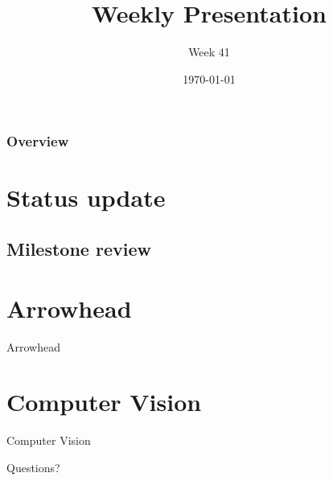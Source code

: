 \documentclass{beamer}
\title{Weekly Presentation}
\subtitle{Week 41}
\author{}
\institute{Luleå University of Technology}
\date{\today}
\begin{document}
\begin{frame}
    \titlepage
\end{frame}

\begin{frame}
    \frametitle{Overview}
    \tableofcontents
\end{frame}

\section{Status update}
%
\subsection{Milestone review}



\section{Arrowhead}
\begin{frame}
    \centering
    \Huge Arrowhead
\end{frame}

\section{Computer Vision}
\begin{frame}
    \centering
    \Huge Computer Vision
\end{frame}



\begin{frame}
    \begin{center}
        \Huge Questions?
    \end{center}
\end{frame}
\end{document}
